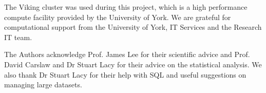 \documentclass[journal abbreviation, manuscript]{copernicus}
\begin{document}









\appendixfigures  %

\appendixtables   %






\begin{acknowledgements}
The Viking cluster was used during this project, which is a high performance compute facility provided by the University of York. We are grateful for computational support from the University of York, IT Services and the Research IT team.

The Authors acknowledge Prof. James Lee for their scientific advice and Prof. David Carslaw and Dr Stuart Lacy for their advice on the statistical analysis. We also thank Dr Stuart Lacy for their help with SQL and useful suggestions on managing large datasets. 
\end{acknowledgements}
\end{document}
